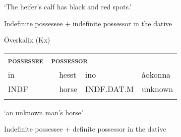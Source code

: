 \begin{styleTranslation}
‘The heifer’s calf has black and red spots.’

\end{styleTranslation}


\begin{listWWNumxiileveli}
\item {}

\begin{styleListii}
Indefinite possessee + indefinite possessor in the dative

\end{styleListii}

\end{listWWNumxiileveli}

\begin{listWWNumileveli}
\item {}

\begin{styleExample}
Överkalix (Kx)

\end{styleExample}

\end{listWWNumileveli}

\begin{tabular}{llllll}
\lsptoprule
{\bfseries\scshape possessee} & \multicolumn{4}{l}{{\bfseries\scshape possessor}

} & \\
\multicolumn{2}{l}{in

} & hesst & ino & \multicolumn{2}{l}{åokonna

}\\
\multicolumn{2}{l}{INDF

} & horse & INDF.DAT.M & \multicolumn{2}{l}{unknown

}\\
\lspbottomrule
\end{tabular}

\begin{styleTranslation}
 ‘an unknown man’s horse’

\end{styleTranslation}


\begin{listWWNumxiileveli}
\item {}

\begin{styleListii}
Indefinite possessee + definite possessor in the dative

\end{styleListii}

\end{listWWNumxiileveli}

